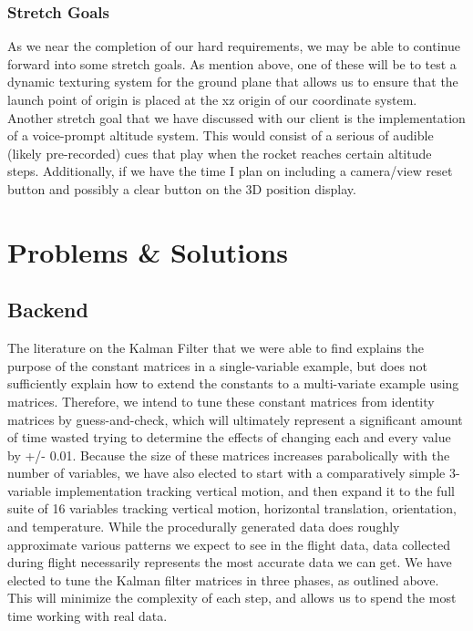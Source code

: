 \documentclass[journal,10pt,onecolumn,compsoc]{IEEEtran}
\begin{document}
		\subsubsection{Stretch Goals}
			As we near the completion of our hard requirements, we may be able to continue forward into some stretch goals.
			As mention above, one of these will be to test a dynamic texturing system for the ground plane that allows us to ensure that the launch point of origin is placed at the xz origin of our coordinate system.
			Another stretch goal that we have discussed with our client is the implementation of a voice-prompt altitude system.
			This would consist of a serious of audible (likely pre-recorded) cues that play when the rocket reaches certain altitude steps.
			Additionally, if we have the time I plan on including a camera/view reset button and possibly a clear button on the 3D position display.
\newpage


\section{Problems \& Solutions}

	\subsection{Backend}
		The literature on the Kalman Filter that we were able to find explains the purpose of the constant matrices in a single-variable example, but does not sufficiently explain how to extend the constants to a multi-variate example using matrices.
		Therefore, we intend to tune these constant matrices from identity matrices by guess-and-check, which will ultimately represent a significant amount of time wasted trying to determine the effects of changing each and every value by +/- 0.01.
		Because the size of these matrices increases parabolically with the number of variables, we have also elected to start with a comparatively simple 3-variable implementation tracking vertical motion, and then expand it to the full suite of 16 variables tracking vertical motion, horizontal translation, orientation, and temperature.
		While the procedurally generated data does roughly approximate various patterns we expect to see in the flight data, data collected during flight necessarily represents the most accurate data we can get.
		We have elected to tune the Kalman filter matrices in three phases, as outlined above.
		This will minimize the complexity of each step, and allows us to spend the most time working with real data.
		
\end{document}
